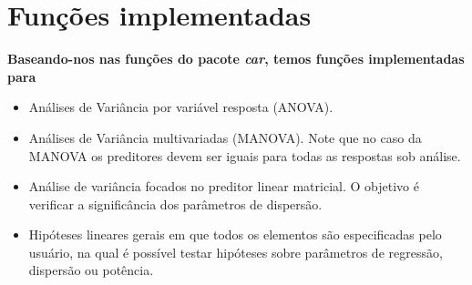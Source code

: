 \documentclass[10pt,
  aspectratio=169,
  serif,
  mathserif,
  professionalfont,
  compress,
  handout,
  ]{beamer}\usepackage[]{graphicx}\usepackage[]{color}
\begin{document}

\section{Funções implementadas}

\begin{frame}[c, allowframebreaks]

\textbf{Baseando-nos nas funções do pacote \emph{car}, temos funções implementadas para}

\begin{itemize}
  
  \item Análises de Variância por variável resposta (ANOVA).
  
  \item Análises de Variância multivariadas (MANOVA). Note que no caso da MANOVA os preditores devem ser iguais para todas as respostas sob análise. 
  
  \item Análise de variância focados no preditor linear matricial. O objetivo é verificar a significância dos parâmetros de dispersão.
  
  \item Hipóteses lineares gerais em que todos os elementos são especificadas pelo usuário, na qual é possível testar hipóteses sobre parâmetros de regressão, dispersão ou potência. 
  
\end{itemize}

\end{frame}

\end{document}
